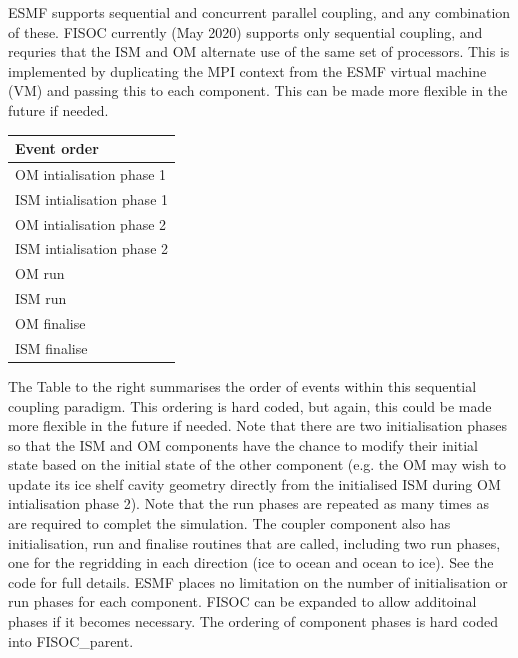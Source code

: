 \documentclass[11pt]{article}
\begin{document}
ESMF supports sequential and concurrent parallel coupling, and any combination of these. 
FISOC currently (May 2020) supports only sequential coupling, and requries that
the ISM and OM alternate use of the same set of processors.
This is implemented by duplicating the MPI context from the ESMF virtual machine (VM)
and passing this to each component. 
This can be made more flexible in the future if needed. 


\begin{table}
  \begin{tabular}{|l}
    \textbf{Event order}  \\
    \hline
    OM intialisation phase 1 \\
    ISM intialisation phase 1 \\
    OM intialisation phase 2 \\
    ISM intialisation phase 2 \\
    OM run \\
    ISM run \\
    OM finalise \\
    ISM finalise \\
  \end{tabular}
  \label{tab:order}
\end{table}

The Table to the right summarises the order of events within this sequential coupling paradigm.
This ordering is hard coded, but again, this could be made more flexible in the future
if needed.
Note that there are two initialisation phases so that the ISM and OM components have the chance
to modify their initial state based on the initial state of the other component
(e.g. the OM may wish to update its ice shelf cavity geometry directly from the initialised
ISM during OM intialisation phase 2).
Note that the run phases are repeated as many times as are required to complet the simulation.
The coupler component also has initialisation, run and finalise routines that are called,
including two run phases, one for the regridding in each direction (ice to ocean and ocean to ice).
See the code for full details. 
ESMF places no limitation on the number of initialisation or run phases for each component. 
FISOC can be expanded to allow additoinal  phases if it becomes necessary. 
The ordering of component phases is hard coded into FISOC\_parent.




\clearpage

\appendix
\end{document}
